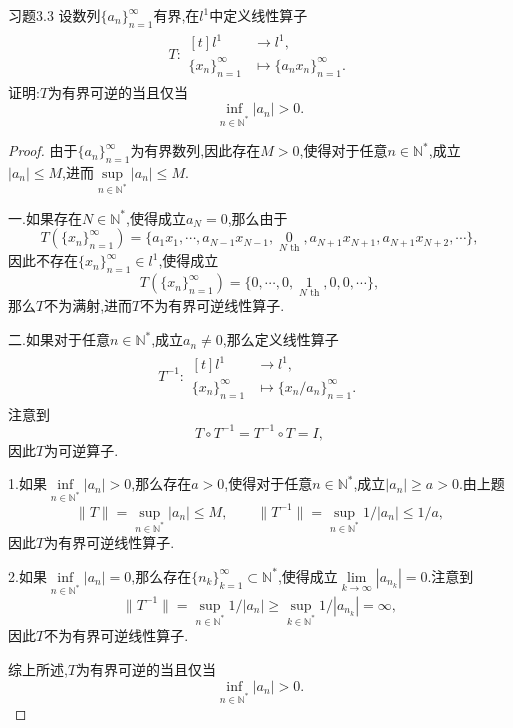 \documentclass[lang = cn, scheme = chinese]{elegantbook}
\begin{document}
	\begin{proposition}{习题3.3}
		设数列$\{a_n\}_{n=1}^\infty$有界,在$l^1$中定义线性算子
		\begin{align*}
			T:\begin{aligned}[t]
				l^1&\longrightarrow l^1,\\
				\{ x_n \}_{n=1}^{\infty}&\longmapsto \{ a_nx_n \}_{n=1}^{\infty}.
			\end{aligned}
		\end{align*}
		证明:$T$为有界可逆的当且仅当
		$$
		\inf_{n\in\mathbb{N}^*}|a_n|>0.
		$$
	\end{proposition}
	
	\begin{proof}
		由于$\{ a_n \}_{n=1}^{\infty}$为有界数列,因此存在$M>0$,使得对于任意$n\in\mathbb{N}^*$,成立$|a_n|\le M$,进而$\sup\limits_{n\in\mathbb{N}^*}|a_n|\le M$.
		
		一.如果存在$N\in\mathbb{N}^*$,使得成立$a_N=0$,那么由于
		$$
		T(\{ x_n \}_{n=1}^{\infty})=\{ a_1x_1,\cdots,a_{N-1}x_{N-1},\mathop{0}\limits_{N \text{ th}},a_{N+1}x_{N+1},a_{N+1}x_{N+2},\cdots \},
		$$
		因此不存在$\{ x_n \}_{n=1}^{\infty}\in l^1$,使得成立
		$$
		T(\{ x_n \}_{n=1}^{\infty})=\{ 0,\cdots,0,\mathop{1}\limits_{N \text{ th}},0,0,\cdots \},
		$$
		那么$T$不为满射,进而$T$不为有界可逆线性算子.
		
		二.如果对于任意$n\in\mathbb{N}^*$,成立$a_n\ne0$,那么定义线性算子
		\begin{align*}
			T^{-1}:\begin{aligned}[t]
				l^1&\longrightarrow l^1,\\
				\{ x_n \}_{n=1}^{\infty}&\longmapsto \{ x_n/a_n \}_{n=1}^{\infty}.
			\end{aligned}
		\end{align*}
		注意到
		$$
		T\circ T^{-1}=T^{-1}\circ T=I,
		$$
		因此$T$为可逆算子.
		
		1.如果$\inf\limits_{n\in\mathbb{N}^*}|a_n|>0$,那么存在$a>0$,使得对于任意$n\in\mathbb{N}^*$,成立$|a_n|\ge a>0$.由上题
		$$
		\|T\|=\sup_{n\in\mathbb{N}^*}|a_n|\le M,\qquad \|T^{-1}\|=\sup_{n\in\mathbb{N}^*}1/|a_n|\le 1/a,
		$$
		因此$T$为有界可逆线性算子.
		
		2.如果$\inf\limits_{n\in\mathbb{N}^*}|a_n|=0$,那么存在$\{ n_k \}_{k=1}^{\infty}\subset\mathbb{N}^*$,使得成立$\lim\limits_{k\to\infty}|a_{n_k}|=0$.注意到
		$$
		\|T^{-1}\|=\sup_{n\in\mathbb{N}^*}1/|a_n|\ge \sup_{k\in\mathbb{N}^*}1/|a_{n_k}|=\infty,
		$$
		因此$T$不为有界可逆线性算子.
		
		综上所述,$T$为有界可逆的当且仅当
		$$
		\inf_{n\in\mathbb{N}^*}|a_n|>0.
		$$
	\end{proof}
	
\end{document}

